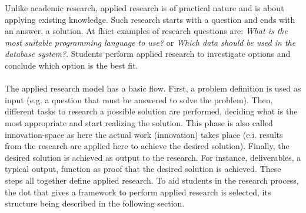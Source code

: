 Unlike academic research, applied research is of practical nature and is about applying existing knowledge. 
Such research starts with a question and ends with an answer, a solution.
At \acrshort{fhict} examples of research questions are:
\textit{What is the most suitable programming language to use?} or 
\textit{Which data should be used in the database system?}.
Students perform applied research to investigate options and conclude which option is the best fit.\\\\
The applied research model has a basic flow.
First, a problem definition is used as input (e.g. a question that must be answered to solve the problem).
Then, different tasks to research a possible solution are performed, deciding what is the most appropriate and start realizing the solution. 
This phase is also called innovation-space as here the actual work (innovation) takes place (e.i. results from the research are applied here to achieve the desired solution).
Finally, the desired solution is achieved as output to the research. 
For instance, deliverables, a typical output, function as proof that the desired solution is achieved.
These steps all together define applied research.
To aid students in the research process, the \acrfull{dot} that gives a framework to perform applied research is selected, its structure being described in the following section.




